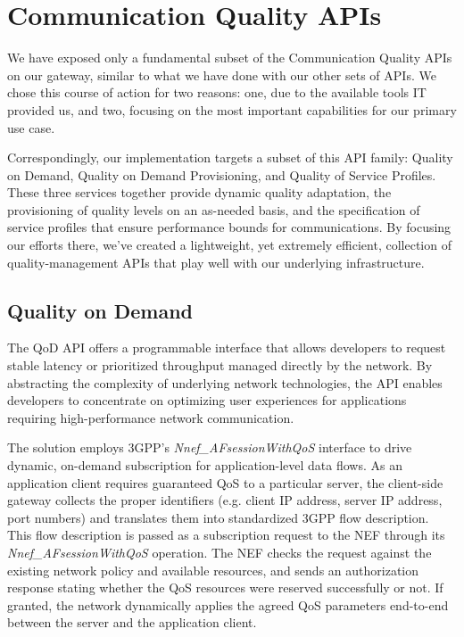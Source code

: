 
\section{Communication Quality APIs}

We have exposed only a fundamental subset of the Communication Quality APIs on
our gateway, similar to what we have done with our other sets of APIs. We chose
this course of action for two reasons: one, due to the available tools IT
provided us, and two, focusing on the most important capabilities for our
primary use case.

Correspondingly, our implementation targets a subset of this API family:
Quality on Demand, Quality on Demand Provisioning, and Quality of Service
Profiles. These three services together provide dynamic quality adaptation, the
provisioning of quality levels on an as-needed basis, and the specification of
service profiles that ensure performance bounds for communications. By focusing
our efforts there, we’ve created a lightweight, yet extremely efficient,
collection of quality-management APIs that play well with our underlying
infrastructure.

\subsection{Quality on Demand}

The QoD API offers a programmable interface that allows developers to request
stable latency or prioritized throughput managed directly by the network. By
abstracting the complexity of underlying network technologies, the API enables
developers to concentrate on optimizing user experiences for applications
requiring high-performance network communication.

The solution employs 3GPP’s \emph{Nnef\_AFsessionWithQoS} interface to drive
dynamic, on-demand subscription for application-level data flows. As an
application client requires guaranteed QoS to a particular server, the
client-side gateway collects the proper identifiers (e.g. client IP address,
server IP address, port numbers) and translates them into standardized 3GPP
flow description. This flow description is passed as a subscription request to
the NEF through its \emph{Nnef\_AFsessionWithQoS} operation. The NEF checks the
request against the existing network policy and available resources, and sends
an authorization response stating whether the QoS resources were reserved
successfully or not. If granted, the network dynamically applies the agreed QoS
parameters end-to-end between the server and the application client.

